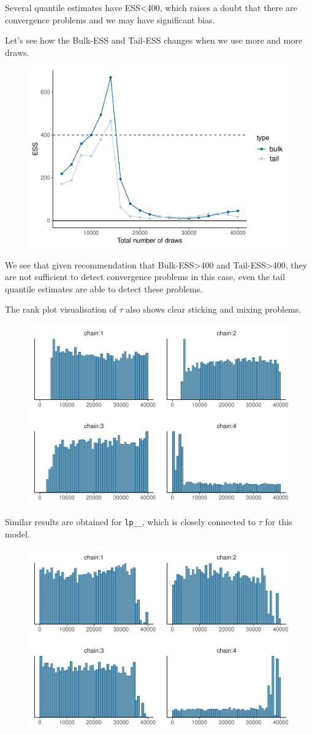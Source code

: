 \documentclass[american,]{article}
\begin{document}
Several quantile estimates have ESS\textless{}400, which raises a doubt
that there are convergence problems and we may have significant bias.

Let's see how the Bulk-ESS and Tail-ESS changes when we use more and
more draws.

\begin{figure}[tp]
  \centering
  \includegraphics[width=0.6\linewidth]{graphics/change-ess-fit-cp2-tau-1.pdf}
\end{figure}

We see that given recommendation that Bulk-ESS\textgreater{}400 and
Tail-ESS\textgreater{}400, they are not sufficient to detect convergence
problems in this case, even the tail quantile estimates are able to
detect these problems.

The rank plot visualisation of $\tau$ also shows clear sticking
and mixing problems.

\begin{figure}[tp]
  \centering
  \includegraphics[width=0.6\linewidth]{graphics/hist-fit-cp2-tau-1.pdf}
\end{figure}

Similar results are obtained for \texttt{lp\_\_}, which is closely
connected to $\tau$ for this model.

\begin{figure}[tp]
  \centering
  \includegraphics[width=0.6\linewidth]{graphics/hist-fit-cp2-lp-1.pdf}
\end{figure}
\end{document}
